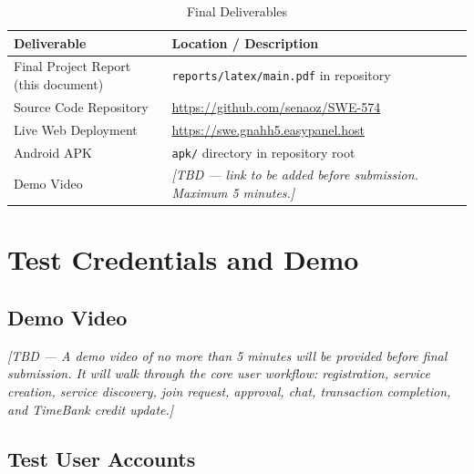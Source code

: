\documentclass[10pt,a4paper]{report}
\begin{document}
\begin{table}[h]
    \centering
    \begin{tabularx}{\textwidth}{|l|X|}
        \hline
        \textbf{Deliverable}                  & \textbf{Location / Description}                                                            \\
        \hline
        Final Project Report (this document)  & \texttt{reports/latex/main.pdf} in repository                                              \\
        \hline
        Source Code Repository                & \url{https://github.com/senaoz/SWE-574}                                                    \\
        \hline
        Live Web Deployment                   & \url{https://swe.gnahh5.easypanel.host}                                                    \\
        \hline
        Android APK                           & \texttt{apk/} directory in repository root                                                 \\
        \hline
        Demo Video                            & \textit{[TBD --- link to be added before submission. Maximum 5 minutes.]}                  \\
        \hline
    \end{tabularx}
    \caption{Final Deliverables}
\end{table}

\chapter{Test Credentials and Demo}

\section{Demo Video}

\textit{[TBD --- A demo video of no more than 5 minutes will be provided before final submission. It will walk through the core user workflow: registration, service creation, service discovery, join request, approval, chat, transaction completion, and TimeBank credit update.]}

\section{Test User Accounts}
\end{document}
